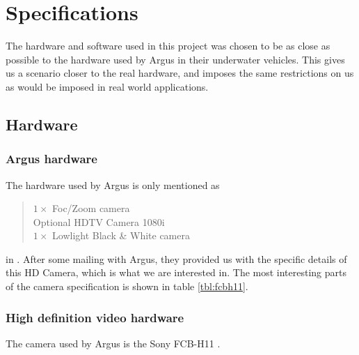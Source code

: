 
\chapter{Specifications}
The hardware and software used in this project was chosen to be as close as possible to the 
hardware used by Argus in their underwater vehicles. This gives us 
a scenario closer to the real hardware, and imposes the same 
restrictions on us as would be imposed in real world applications.

\section{Hardware}

\subsection{Argus hardware}
The hardware used by Argus is only mentioned as 
\begin{quote}
$1\times$ Foc/Zoom camera \\
Optional HDTV Camera 1080i \\
$1\times$ Lowlight Black \& White camera \\
\end{quote}
in \citet{argusROV}. After some mailing with Argus, they provided us 
with the specific details of this HD Camera, which is what we are interested in. 
The most interesting parts of the camera specification is shown in table \vref{tbl:fcbh11}.

\subsection{High definition video hardware}
The camera used by Argus is the Sony FCB-H11 \citet{fcbh11}. 

